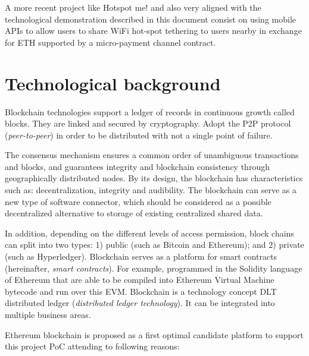\documentclass[12pt]{amsart}
\begin{document}
\begin{multicols}{2}
\vspace{0.35cm}

A more recent project like Hotspot me!\cite{hotspotme}
and also very aligned with the technological demonstration
described in this document consist on using mobile
APIs to allow users to share WiFi hot-spot tethering
to users nearby in exchange for ETH supported by a
micro-payment channel contract.


\section{Technological background}\label{ch:bc}

\vspace{0.35cm}

Blockchain technologies support a ledger of records in
continuous growth called blocks.
They are linked and secured by
cryptography. Adopt the P2P protocol
(\textit{peer-to-peer}) in order to be distributed
with not a single point of failure.

\vspace{0.35cm}

The consensus mechanism ensures a common order
of unambiguous transactions and
blocks, and guarantees integrity and
blockchain consistency
through geographically distributed nodes.
By its design, the blockchain has characteristics
such as: decentralization, integrity and audibility.
The blockchain can serve as a new
type of software connector, which should be considered
as a possible decentralized alternative to storage
of existing centralized shared data.

\vspace{0.35cm}

In addition, depending on the different levels of
access permission, block chains can
split into two types:
1) public (such as Bitcoin and Ethereum); and
2) private (such as Hyperledger). Blockchain serves
as a platform for smart contracts
(hereinafter, \textit{smart contracts}).
For example, programmed in the Solidity language of
Ethereum that are able to be compiled into Ethereum
Virtual Machine bytecode and run over this EVM.
Blockchain is a technology concept
DLT distributed ledger
(\textit{distributed ledger technology}).
It can be integrated into multiple business areas.

\vspace{0.35cm}

Ethereum
blockchain is proposed as a first optimal candidate platform
to support this project PoC attending to
following reasons:


\end{multicols}
\end{document}
